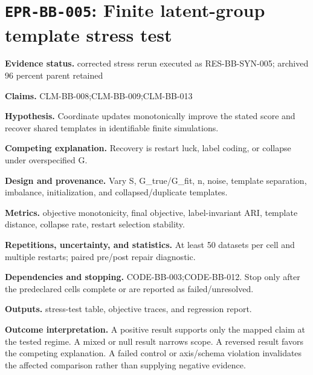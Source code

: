 \section[\texttt{EPR-BB-005}]{\texttt{EPR-BB-005}: Finite latent-group template stress test}
\textbf{Evidence status.} corrected stress rerun executed as RES-BB-SYN-005; archived 96 percent parent retained\par
\textbf{Claims.} CLM-BB-008;CLM-BB-009;CLM-BB-013\par
\textbf{Hypothesis.} Coordinate updates monotonically improve the stated score and recover shared templates in identifiable finite simulations.\par
\textbf{Competing explanation.} Recovery is restart luck, label coding, or collapse under overspecified G.\par
\textbf{Design and provenance.} Vary S, G\_true/G\_fit, n, noise, template separation, imbalance, initialization, and collapsed/duplicate templates.\par
\textbf{Metrics.} objective monotonicity, final objective, label-invariant ARI, template distance, collapse rate, restart selection stability.\par
\textbf{Repetitions, uncertainty, and statistics.} At least 50 datasets per cell and multiple restarts; paired pre/post repair diagnostic.\par
\textbf{Dependencies and stopping.} CODE-BB-003;CODE-BB-012. Stop only after the predeclared cells complete or are reported as failed/unresolved.\par
\textbf{Outputs.} stress-test table, objective traces, and regression report.\par
\textbf{Outcome interpretation.} A positive result supports only the mapped claim at the tested regime. A mixed or null result narrows scope. A reversed result favors the competing explanation. A failed control or axis/schema violation invalidates the affected comparison rather than supplying negative evidence.

